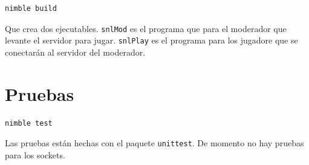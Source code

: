 \documentclass[11pt]{article}
\begin{document}
\begin{verbatim}
nimble build
\end{verbatim}

Que crea dos ejecutables. \texttt{snlMod} es el programa que para el moderador que
levante el servidor para jugar. \texttt{snlPlay} es el programa para los jugadore que
se conectarán al servidor del moderador.

\section{Pruebas}
\label{sec:orgcb6e6b6}

\begin{verbatim}
nimble test
\end{verbatim}

Las pruebas están hechas con el paquete \texttt{unittest}. De momento no hay pruebas
para los sockets.
\end{document}
